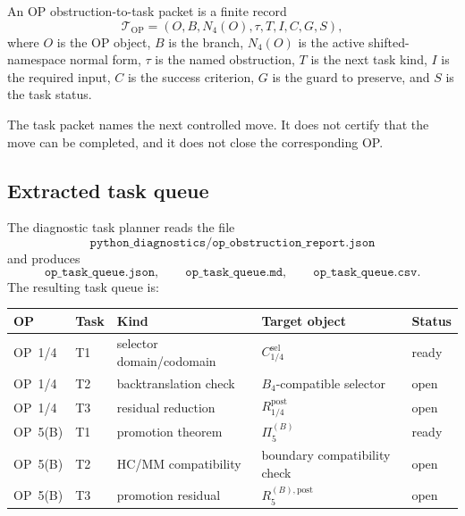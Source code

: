 \begin{definition}
\label{def:v410r03-op-obstruction-to-task-packet}
An OP obstruction-to-task packet is a finite record
\[
 \mathcal T_{\mathrm{OP}}
 =
 (O,B,N_4(O),\tau,T,I,C,G,S),
\]
where \(O\) is the OP object, \(B\) is the branch, \(N_4(O)\) is the active
shifted-namespace normal form, \(\tau\) is the named obstruction, \(T\) is the next task
kind, \(I\) is the required input, \(C\) is the success criterion, \(G\) is the
guard to preserve, and \(S\) is the task status.
\end{definition}

\begin{remark}
\label{rem:v410r03-task-packets-not-proof-packets}
The task packet names the next controlled move. It does not certify that the
move can be completed, and it does not close the corresponding OP.
\end{remark}

\subsection{Extracted task queue}
\label{subsec:v410r03-extracted-task-queue}

The diagnostic task planner reads the file
\[
 \texttt{python\_diagnostics/op\_obstruction\_report.json}
\]
and produces
\[
 \texttt{op\_task\_queue.json},\qquad
 \texttt{op\_task\_queue.md},\qquad
 \texttt{op\_task\_queue.csv}.
\]
The resulting task queue is:

\begin{center}
\small
\setlength{\tabcolsep}{3pt}
\begin{tabular}{@{}p{}P{0.12\textwidth}P{0.26\textwidth}P{0.25\textwidth}P{0.12\textwidth}@{}}
\toprule
OP & Task & Kind & Target object & Status\\
\midrule
OP~1/4 & T1 & selector domain/codomain & $C_{1/4}^{\mathrm{sel}}$ & ready \\
OP~1/4 & T2 & backtranslation check & $B_4$-compatible selector & open \\
OP~1/4 & T3 & residual reduction & $R_{1/4}^{\mathrm{post}}$ & open \\
OP~5(B) & T1 & promotion theorem & $\Pi_{5}^{(B)}$ & ready \\
OP~5(B) & T2 & HC/MM compatibility & boundary compatibility check & open \\
OP~5(B) & T3 & promotion residual & $R_{5}^{(B),\mathrm{post}}$ & open \\
\bottomrule
\end{tabular}
\end{center}

